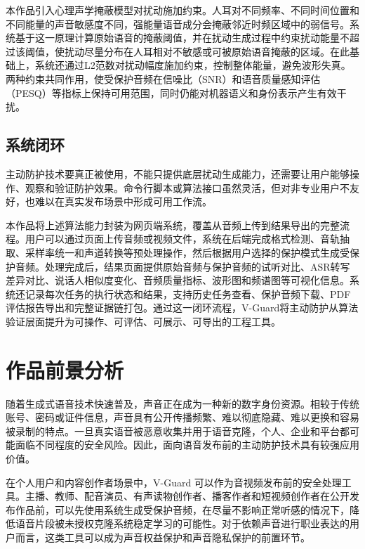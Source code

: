 本作品引入心理声学掩蔽模型对扰动施加约束。人耳对不同频率、不同时间位置和不同能量的声音敏感度不同，强能量语音成分会掩蔽邻近时频区域中的弱信号。系统基于这一原理计算原始语音的掩蔽阈值，并在扰动生成过程中约束扰动能量不超过该阈值，使扰动尽量分布在人耳相对不敏感或可被原始语音掩蔽的区域。在此基础上，系统还通过L2范数对扰动幅度施加约束，控制整体能量，避免波形失真。两种约束共同作用，使受保护音频在信噪比（SNR）和语音质量感知评估（PESQ）等指标上保持可用范围，同时仍能对机器语义和身份表示产生有效干扰。

\subsection{系统闭环}\label{ux7cfbux7edfux95edux73af}

主动防护技术要真正被使用，不能只提供底层扰动生成能力，还需要让用户能够操作、观察和验证防护效果。命令行脚本或算法接口虽然灵活，但对非专业用户不友好，也难以在真实发布场景中形成可用工作流。

本作品将上述算法能力封装为网页端系统，覆盖从音频上传到结果导出的完整流程。用户可以通过页面上传音频或视频文件，系统在后端完成格式检测、音轨抽取、采样率统一和声道转换等预处理操作，然后根据用户选择的保护模式生成受保护音频。处理完成后，结果页面提供原始音频与保护音频的试听对比、ASR转写差异对比、说话人相似度变化、音频质量指标、波形图和频谱图等可视化信息。系统还记录每次任务的执行状态和结果，支持历史任务查看、保护音频下载、PDF评估报告导出和完整证据链打包。通过这一闭环流程，V-Guard将主动防护从算法验证层面提升为可操作、可评估、可展示、可导出的工程工具。

\section{作品前景分析}\label{ux4f5cux54c1ux524dux666fux5206ux6790}

随着生成式语音技术快速普及，声音正在成为一种新的数字身份资源。相较于传统账号、密码或证件信息，声音具有公开传播频繁、难以彻底隐藏、难以更换和容易被录制的特点。一旦真实语音被恶意收集并用于语音克隆，个人、企业和平台都可能面临不同程度的安全风险。因此，面向语音发布前的主动防护技术具有较强应用价值。

在个人用户和内容创作者场景中，V-Guard
可以作为音视频发布前的安全处理工具。主播、教师、配音演员、有声读物创作者、播客作者和短视频创作者在公开发布作品前，可以先使用系统生成受保护音频，在尽量不影响正常听感的情况下，降低语音片段被未授权克隆系统稳定学习的可能性。对于依赖声音进行职业表达的用户而言，这类工具可以成为声音权益保护和声音隐私保护的前置环节。

